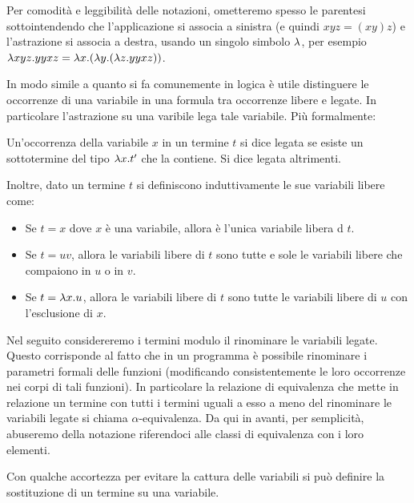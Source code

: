 \documentclass[]{marticle}
\begin{document}
Per comodit\`a e leggibilit\`a delle notazioni, ometteremo spesso le parentesi
sottointendendo che l'applicazione si associa a sinistra (e quindi $xyz=(xy)z$)
e l'astrazione si associa a destra, usando un singolo simbolo $\lambda$, per esempio
$\lambda xyz.yyxz = \lambda x. (\lambda y. (\lambda z. yyxz))$. 

In modo simile a quanto si fa comunemente in logica \`e utile distinguere le
occorrenze di una variabile in una formula tra occorrenze libere e legate. In
particolare l'astrazione su una varibile lega tale variabile. Pi\`u formalmente:

\begin{block}[Definizione]
    Un'occorrenza della variabile $x$ in un termine $t$ si dice legata se esiste
    un sottotermine del tipo $\lambda x. t'$ che la contiene. Si dice legata
    altrimenti.

    Inoltre, dato un termine $t$ si definiscono induttivamente le sue variabili
    libere come:
    \begin{itemize}
        \item Se $t=x$ dove $x$ \`e una variabile, allora \`e l'unica variabile
            libera d $t$.
        \item Se $t=uv$, allora le variabili libere di $t$ sono tutte e sole le
            variabili libere che compaiono in $u$ o in $v$.
        \item Se $t=\lambda x. u$, allora le variabili libere di $t$ sono tutte le
            variabili libere di $u$ con l'esclusione di $x$.
    \end{itemize}
\end{block}

Nel seguito considereremo i termini modulo il rinominare le variabili legate.
Questo corrisponde al fatto che in un programma \`e possibile rinominare i
parametri formali delle funzioni (modificando consistentemente le loro
occorrenze nei corpi di tali funzioni). In particolare la relazione di
equivalenza che mette in relazione un termine con tutti i termini uguali a esso
a meno del rinominare le variabili legate si chiama $\alpha$-equivalenza. Da qui
in avanti, per semplicit\`a, abuseremo della notazione riferendoci alle classi
di equivalenza con i loro elementi.

Con qualche accortezza per evitare la cattura delle variabili si pu\`o definire
la sostituzione di un termine su una variabile.
\end{document}
